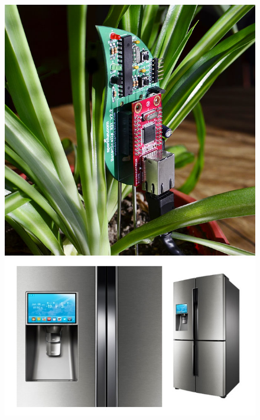 \documentclass{beamer}
\begin{document}
\begin{frame}[t]
    \begin{figure}[htb]
    \begin{minipage}{0.3\textwidth}
      \centering
        \includegraphics[scale=0.45]{presentation/img/smart-plant.jpg}
      \end{minipage}%
      \begin{minipage}{0.3\textwidth}
        \centering
          \includegraphics[scale=0.2]{presentation/img/smart-fridge.jpg}
      \end{minipage}%
      \begin{minipage}{0.3\textwidth}

\end{minipage}
\end{figure}
\end{frame}
\end{document}
